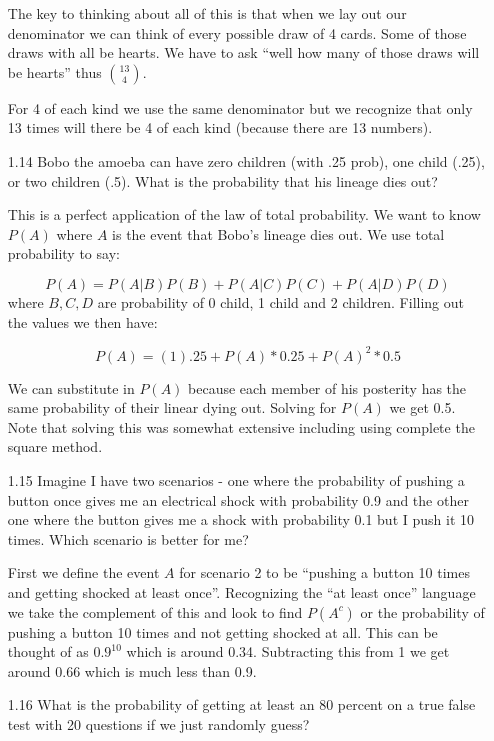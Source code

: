\begin{enumerate}
The key to thinking about all of this is that when we lay out our denominator we can think of every possible draw of 4 cards. Some of those draws with all be hearts. We have to ask ``well how many of those draws will be hearts'' thus $13 \choose 4$.

For 4 of each kind we use the same denominator but we recognize that only 13 times will there be 4 of each kind (because there are 13 numbers).

\item[1.14]
Bobo the amoeba can have zero children (with .25 prob), one child (.25), or two children (.5). What is the probability that his lineage dies out?

This is a perfect application of the law of total probability. We want to know $P(A)$ where $A$ is the event that Bobo's lineage dies out. We use total probability to say:

\begin{equation}
P(A) = P(A|B)P(B) + P(A|C)P(C) + P(A|D)P(D)
\end{equation} 
\noindent where $B,C,D$ are probability of 0 child, 1 child and 2 children. Filling out the values we then have:


\begin{equation}
P(A) = (1).25 + P(A)*0.25 + P(A)^2 * 0.5
\end{equation} 

We can substitute in $P(A)$ because each member of his posterity has the same probability of their linear dying out. Solving for $P(A)$ we get 0.5. Note that solving this was somewhat extensive including using complete the square method. 

\item[1.15]
Imagine I have two scenarios - one where the probability of pushing a button once gives me an electrical shock with probability 0.9 and the other one where the button gives me a shock with probability 0.1 but I push it 10 times. Which scenario is better for me?

First we define the event $A$ for scenario 2 to be ``pushing a button 10 times and getting shocked at least once''. Recognizing the ``at least once'' language we take the complement of this and look to find $P(A^{c})$ or the probability of pushing a button 10 times and not getting shocked at all. This can be thought of as $0.9^{10}$ which is around 0.34. Subtracting this from 1 we get around 0.66 which is much less than 0.9. 

\item[1.16]
What is the probability of getting at least an 80 percent on a true false test with 20 questions if we just randomly guess?


\end{enumerate}
